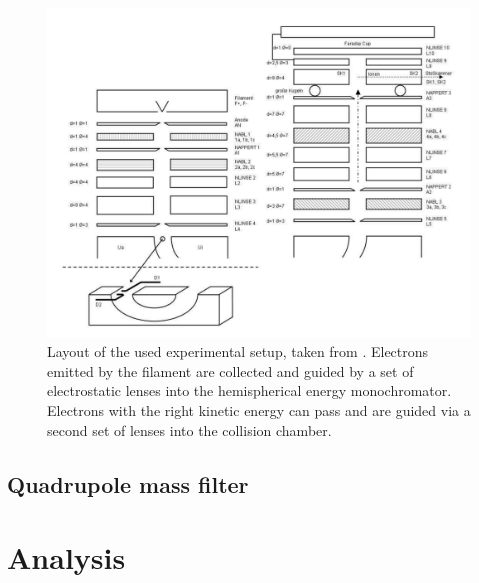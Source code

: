 \documentclass[a4paper,10pt]{article}
\begin{document}
\begin{figure}[H]
	\centering
	\includegraphics[width = 1 \textwidth]{setup.png}
	\caption{Layout of the used experimental setup, taken from \cite{script}. Electrons emitted by the filament are collected and guided by a set of electrostatic lenses into the hemispherical energy monochromator. Electrons with the right kinetic energy can pass and are guided via a second set of lenses into the collision chamber. }
	\label{setup}
\end{figure}

\subsection{Quadrupole mass filter}
\section{Analysis}
\end{document}
